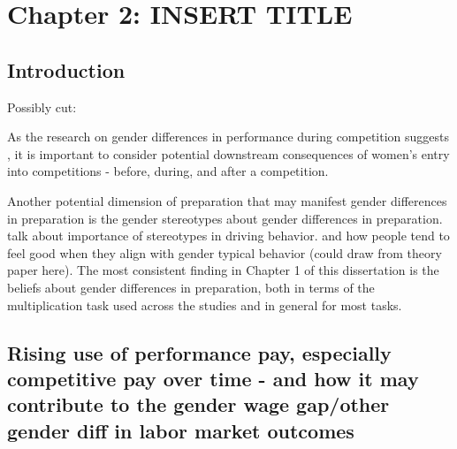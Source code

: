 \documentclass[a4paper, nobind]{templates/ociamthesis}
\begin{document}
\hypertarget{chapter-2-insert-title}{%
\chapter{Chapter 2: INSERT TITLE}\label{chapter-2-insert-title}}

\hypertarget{introduction-2}{%
\section{Introduction}\label{introduction-2}}

Possibly cut:

As the research on gender differences in performance during competition suggests \autocite{Gneezy2003,Gneezy2004,Gunther2010,Gill2014,Buser2019,Samak2013,Miller2019a}, it is important to consider potential downstream consequences of women's entry into competitions - before, during, and after a competition.

Another potential dimension of preparation that may manifest gender differences in preparation is the gender stereotypes about gender differences in preparation. talk about importance of stereotypes in driving behavior. and how people tend to feel good when they align with gender typical behavior (could draw from theory paper here). The most consistent finding in Chapter 1 of this dissertation is the beliefs about gender differences in preparation, both in terms of the multiplication task used across the studies and in general for most tasks.

\hypertarget{rising-use-of-performance-pay-especially-competitive-pay-over-time---and-how-it-may-contribute-to-the-gender-wage-gapother-gender-diff-in-labor-market-outcomes}{%
\section{Rising use of performance pay, especially competitive pay over time - and how it may contribute to the gender wage gap/other gender diff in labor market outcomes}\label{rising-use-of-performance-pay-especially-competitive-pay-over-time---and-how-it-may-contribute-to-the-gender-wage-gapother-gender-diff-in-labor-market-outcomes}}
\end{document}
